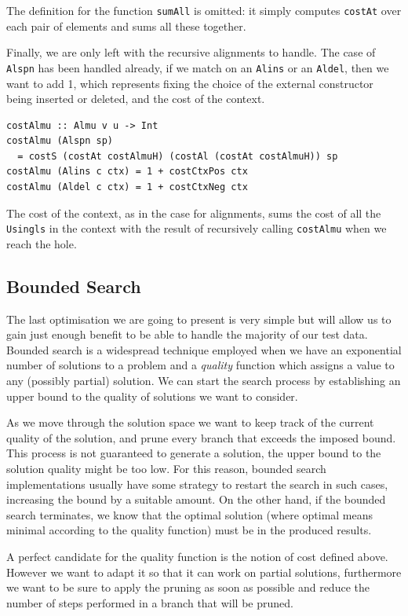 \documentclass[11pt, titlepage]{article}
\newcommand{\toHaskell}[1]{\texttt{#1}\xspace}
\newcommand{\alins}{\toHaskell{Alins}}
\newcommand{\aldel}{\toHaskell{Aldel}}
\newcommand{\alspn}{\toHaskell{Alspn}}
\begin{document}
The definition for the function \toHaskell{sumAll} is omitted: it simply computes \toHaskell{costAt} over each pair of elements and sums all these together.

Finally, we are only left with the recursive alignments to handle. The case of \alspn has been handled already, if we match on an \alins or an \aldel, then we want to add 1, which represents fixing the choice of the external constructor being inserted or deleted, and the cost of the context.

\begin{verbatim}
costAlmu :: Almu v u -> Int
costAlmu (Alspn sp) 
  = costS (costAt costAlmuH) (costAl (costAt costAlmuH)) sp
costAlmu (Alins c ctx) = 1 + costCtxPos ctx
costAlmu (Aldel c ctx) = 1 + costCtxNeg ctx
\end{verbatim}

The cost of the context, as in the case for alignments, sums the cost of all the \toHaskell{Usingls} in the context with the result of recursively calling \toHaskell{costAlmu} when we reach the hole.


\subsection{Bounded Search}\label{bd-search}

The last optimisation we are going to present is very simple but will allow us to gain just enough benefit to be able to handle the majority of our test data. 
Bounded search is a widespread technique employed when we have an exponential number of solutions to a problem and a \emph{quality} function which assigns a value to any (possibly partial) solution. We can start the search process by establishing an upper bound to the quality of solutions we want to consider. 

As we move through the solution space we want to keep track of the current quality of the solution, and prune every branch that exceeds the imposed bound. 
This process is not guaranteed to generate a solution, the upper bound to the solution quality might be too low. For this reason, bounded search implementations usually have some strategy to restart the search in such cases, increasing the bound by a suitable amount. On the other hand, if the bounded search terminates, we know that the optimal solution (where optimal means minimal according to the quality function) must be in the produced results.

A perfect candidate for the quality function is the notion of cost defined above. However we want to adapt it so that it can work on partial solutions, furthermore we want to be sure to apply the pruning as soon as possible and reduce the number of steps performed in a branch that will be pruned.
\end{document}
